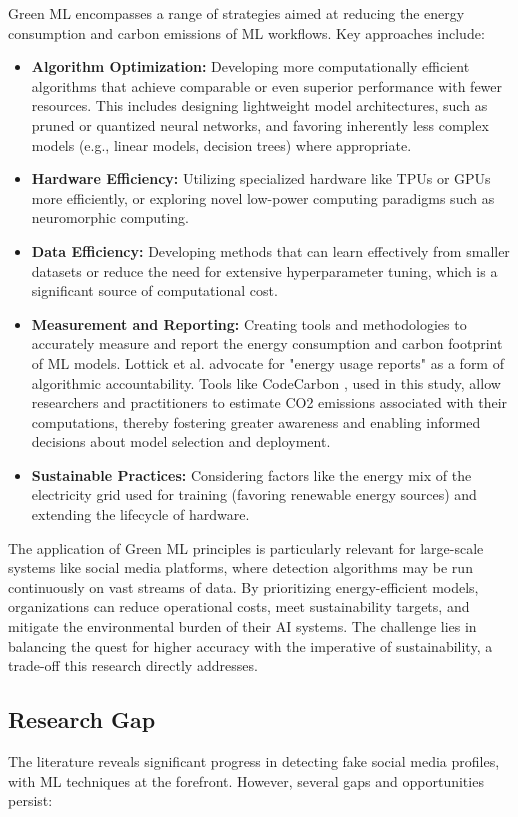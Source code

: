 \documentclass[conference]{IEEEtran}
\begin{document}
Green ML encompasses a range of strategies aimed at reducing the energy consumption and carbon emissions of ML workflows. Key approaches include:
\begin{itemize}
    \item \textbf{Algorithm Optimization:} Developing more computationally efficient algorithms that achieve comparable or even superior performance with fewer resources. This includes designing lightweight model architectures, such as pruned or quantized neural networks, and favoring inherently less complex models (e.g., linear models, decision trees) where appropriate.
    \item \textbf{Hardware Efficiency:} Utilizing specialized hardware like TPUs or GPUs more efficiently, or exploring novel low-power computing paradigms such as neuromorphic computing.
    \item \textbf{Data Efficiency:} Developing methods that can learn effectively from smaller datasets or reduce the need for extensive hyperparameter tuning, which is a significant source of computational cost.
    \item \textbf{Measurement and Reporting:} Creating tools and methodologies to accurately measure and report the energy consumption and carbon footprint of ML models. Lottick et al. \cite{b11} advocate for "energy usage reports" as a form of algorithmic accountability. Tools like CodeCarbon \cite{b13}, used in this study, allow researchers and practitioners to estimate CO2 emissions associated with their computations, thereby fostering greater awareness and enabling informed decisions about model selection and deployment.
    \item \textbf{Sustainable Practices:} Considering factors like the energy mix of the electricity grid used for training (favoring renewable energy sources) and extending the lifecycle of hardware.
\end{itemize}
The application of Green ML principles is particularly relevant for large-scale systems like social media platforms, where detection algorithms may be run continuously on vast streams of data. By prioritizing energy-efficient models, organizations can reduce operational costs, meet sustainability targets, and mitigate the environmental burden of their AI systems. The challenge lies in balancing the quest for higher accuracy with the imperative of sustainability, a trade-off this research directly addresses.

\subsection{Research Gap}
The literature reveals significant progress in detecting fake social media profiles, with ML techniques at the forefront. However, several gaps and opportunities persist:
\end{document}
